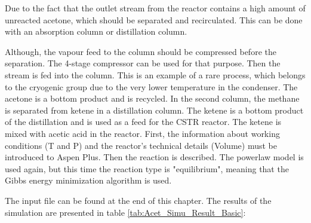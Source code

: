 	Due to the fact that the outlet stream from the reactor contains a high amount of unreacted acetone, which should be separated and recirculated. This can be done with an absorption column or distillation column. 
	
	Although, the vapour feed to the column should be compressed before the separation. The 4-stage compressor can be used for that purpose. 
	Then the stream is fed into the column. This is an example of a rare process, which belongs to the cryogenic group due to the very lower temperature in the condenser. The acetone is a bottom product and is recycled. In the second column, the methane is separated from ketene in a distillation column. 
	The ketene is a bottom product of the distillation and is used as a feed for the CSTR reactor. The ketene is mixed with acetic acid in the reactor. First, the information about working conditions (T and P) and the reactor's technical details (Volume) must be introduced to Aspen Plus. Then the reaction is described. The powerlaw model is used again, but this time the reaction type is "equilibrium", meaning that the Gibbs energy minimization algorithm is used. 
	
	The input file can be found at the end of this chapter. The results of the simulation are presented in table \ref{tab:Acet_Simu_Result_Basic}:
	
